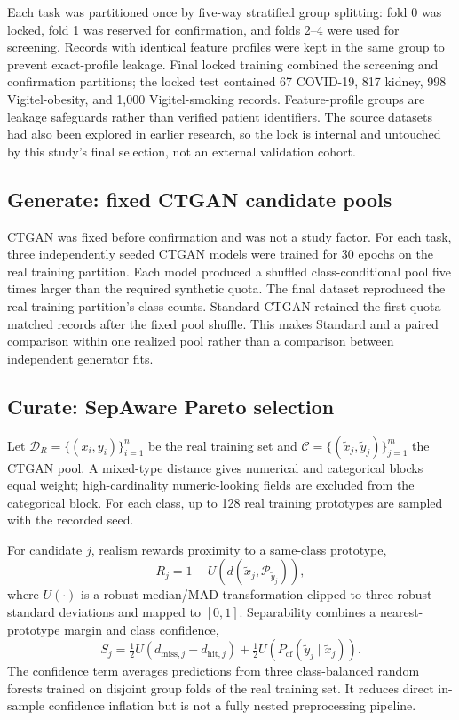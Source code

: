 Each task was partitioned once by five-way stratified group splitting: fold 0 was locked, fold 1 was reserved for confirmation, and folds 2--4 were used for screening. Records with identical feature profiles were kept in the same group to prevent exact-profile leakage. Final locked training combined the screening and confirmation partitions; the locked test contained 67 COVID-19, 817 kidney, 998 Vigitel-obesity, and 1,000 Vigitel-smoking records. Feature-profile groups are leakage safeguards rather than verified patient identifiers. The source datasets had also been explored in earlier research, so the lock is internal and untouched by this study's final selection, not an external validation cohort.

\subsection{Generate: fixed CTGAN candidate pools}

CTGAN was fixed before confirmation and was not a study factor. For each task, three independently seeded CTGAN models were trained for 30 epochs on the real training partition. Each model produced a shuffled class-conditional pool five times larger than the required synthetic quota. The final \tstr{} dataset reproduced the real training partition's class counts. Standard CTGAN retained the first quota-matched records after the fixed pool shuffle. This makes Standard and \sepa{} a paired comparison within one realized pool rather than a comparison between independent generator fits.

\subsection{Curate: SepAware Pareto selection}
\label{sec:selection}

Let $\mathcal D_R=\{(x_i,y_i)\}_{i=1}^{n}$ be the real training set and $\mathcal C=\{(\tilde x_j,\tilde y_j)\}_{j=1}^{m}$ the CTGAN pool. A mixed-type distance gives numerical and categorical blocks equal weight; high-cardinality numeric-looking fields are excluded from the categorical block. For each class, up to 128 real training prototypes are sampled with the recorded seed.

For candidate $j$, realism rewards proximity to a same-class prototype,
\begin{equation}
R_j=1-U\!\left(d(\tilde x_j,\mathcal P_{\tilde y_j})\right),
\end{equation}
where $U(\cdot)$ is a robust median/MAD transformation clipped to three robust standard deviations and mapped to $[0,1]$. Separability combines a nearest-prototype margin and class confidence,
\begin{equation}
S_j=\tfrac12 U\!\left(d_{\mathrm{miss},j}-d_{\mathrm{hit},j}\right)
    +\tfrac12 U(P_{\mathrm{cf}}(\tilde y_j\mid\tilde x_j)).
\end{equation}
The confidence term averages predictions from three class-balanced random forests trained on disjoint group folds of the real training set. It reduces direct in-sample confidence inflation but is not a fully nested preprocessing pipeline.

